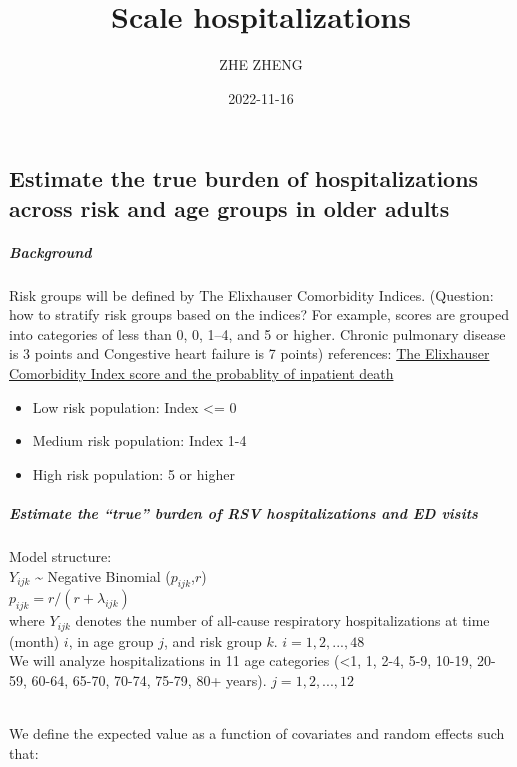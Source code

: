 \documentclass[
]{article}
\title{Scale hospitalizations}
\author{ZHE ZHENG}
\date{2022-11-16}
\providecommand{\tightlist}{%
  \setlength{\itemsep}{0pt}\setlength{\parskip}{0pt}}
\begin{document}
\maketitle

\hypertarget{estimate-the-true-burden-of-hospitalizations-across-risk-and-age-groups-in-older-adults}{%
\subsection{Estimate the true burden of hospitalizations across risk and
age groups in older
adults}\label{estimate-the-true-burden-of-hospitalizations-across-risk-and-age-groups-in-older-adults}}

\hypertarget{background}{%
\subparagraph{Background}\label{background}}

Risk groups will be defined by The Elixhauser Comorbidity Indices.
{(Question: how to stratify risk groups based on the indices?} For
example, scores are grouped into categories of less than 0, 0, 1--4, and
5 or higher. Chronic pulmonary disease is 3 points and Congestive heart
failure is 7 points) references:
\href{https://www.jstor.org/stable/40221931?seq=7\#metadata_info_tab_contents}{The
Elixhauser Comorbidity Index score and the probablity of inpatient
death}

\begin{itemize}
\tightlist
\item
  Low risk population: Index \textless= 0
\item
  Medium risk population: Index 1-4
\item
  High risk population: 5 or higher
\end{itemize}

\hypertarget{estimate-the-true-burden-of-rsv-hospitalizations-and-ed-visits}{%
\subparagraph{Estimate the ``true'' burden of RSV hospitalizations and
ED
visits}\label{estimate-the-true-burden-of-rsv-hospitalizations-and-ed-visits}}

Model structure:\\
\(Y_{ijk}\) \textasciitilde{} Negative Binomial (\(p_{ijk}\),\(r\))\\
\(p_{ijk}=r/(r+λ_{ijk})\)\\
where \(Y_{ijk}\) denotes the number of all-cause respiratory
hospitalizations at time (month) \(i\), in age group \(j\), and risk
group \(k\). \(i = 1,2,...,48\)\\
We will analyze hospitalizations in 11 age categories (\textless1, 1,
2-4, 5-9, 10-19, 20-59, 60-64, 65-70, 70-74, 75-79, 80+ years).
\(j = 1,2,...,12\)\\
\strut \\
We define the expected value as a function of covariates and random
effects such that:
\end{document}
